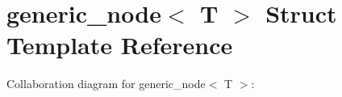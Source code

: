 \hypertarget{structgeneric__node}{}\section{generic\+\_\+node$<$ T $>$ Struct Template Reference}
\label{structgeneric__node}


Collaboration diagram for generic\+\_\+node$<$ T $>$\+:
